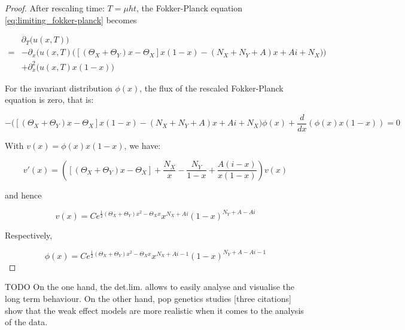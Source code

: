 \documentclass[12pt,a4paper,twoside]{article}
\begin{document}
\begin{proof}
	After rescaling time: $T = \mu h t$, the Fokker-Planck equation \eqref{eq:limiting_fokker-planck} becomes
	
	\begin{align*}
	&\partial_T \big(u\left(x, T\right)\big)\\
	=& -\partial_x\Bigg(u(x,T)\Big(\left[\left(\Theta_X + \Theta_Y\right)x - \Theta_X\right]x\left(1-x\right)-\left(N_X + N_Y + A\right)x+ Ai + N_X\Big)\Bigg)\\
		&+ \partial^2_x\big(u(x,T)x(1-x)\big)
	\end{align*}
	
	For the invariant distribution $\phi(x)$, the flux of the rescaled Fokker-Planck equation is zero, that is:
	
	\begin{equation*}
	-\Big(\left[\left(\Theta_X + \Theta_Y\right)x - \Theta_X\right]x\left(1-x\right)-\left(N_X + N_Y + A\right)x + Ai + N_X\Big)\phi(x) + \frac{d}{dx}\left(\phi(x)x\left(1-x\right)\right)= 0
	\end{equation*}
	
	With $v(x) = \phi(x)x\left(1-x\right)$, we have:
	
	\begin{equation*}
	v'(x) = \left(\left[\left(\Theta_X + \Theta_Y\right)x - \Theta_X\right] + \frac{N_X}{x} - \frac{N_Y}{1-x} + \frac{A(i-x)}{x(1-x)}\right)v(x)
	\end{equation*}
	
	and hence
	
	\begin{equation*}
	v(x) = Ce^{\frac{1}{2}\left(\Theta_X + \Theta_Y\right)x^2 - \Theta_X x}x^{N_X + Ai}\left(1-x\right)^{N_Y+A - Ai}
	\end{equation*}
	
	Respectively,
	
	\begin{equation*}
	\phi(x) = Ce^{\frac{1}{2}\left(\Theta_X + \Theta_Y\right)x^2 - \Theta_X x}x^{N_X + Ai - 1}\left(1-x\right)^{N_Y+A - Ai - 1}
	\end{equation*}
\end{proof}

TODO
On the one hand, the det.lim. allows to easily analyse and visualise the long term behaviour. On the other hand, pop genetics studies [three citations] show that the weak effect models are more realistic when it comes to the analysis of the data.
\end{document}
